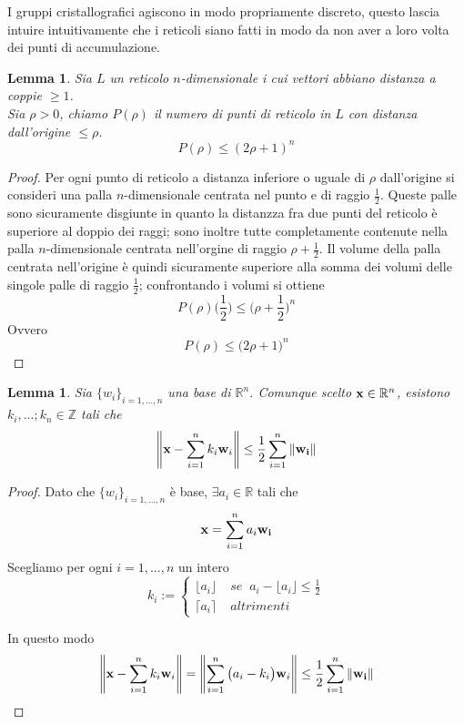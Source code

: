 \documentclass[a4paper,11pt,openright,twoside	]{book}
\newtheorem{lemma}[theorem]{Lemma}
\begin{document}
I gruppi cristallografici agiscono in modo propriamente discreto, questo lascia intuire intuitivamente che i reticoli siano fatti in modo da non aver a loro volta dei punti di accumulazione. 
\begin{lemma}
\label{lemma:rho}
Sia $L$ un reticolo $n$-dimensionale i cui vettori abbiano distanza a coppie $\geq 1$. \\
Sia $\rho >0$, chiamo $P(\rho)$ il numero di punti di reticolo in $L$ con distanza dall'origine $\leq \rho$. 
\[ P(\rho) \leq (2 \rho +1)^n\]
\end{lemma}
\begin{proof}
Per ogni punto di reticolo a distanza inferiore o uguale di $\rho$ dall'origine si consideri una palla $n$-dimensionale centrata nel punto e di raggio $\frac{1}{2}$. Queste palle sono sicuramente disgiunte in quanto la distanzza fra due punti del reticolo è superiore al doppio dei raggi; sono inoltre tutte completamente contenute nella palla $n$-dimensionale centrata nell'orgine di raggio $ \rho + \frac{1}{2}$. 
Il volume della palla centrata nell'origine è quindi sicuramente superiore alla somma dei volumi delle singole palle di raggio $\frac{1}{2}$; confrontando i volumi si ottiene
\[ P(\rho) \bigg(  \frac{1}{2} \bigg) \leq \bigg( \rho + \frac{1}{2} \bigg)^n \]
Ovvero
\[ P(\rho) \leq \bigg( 2 \rho + 1 \bigg)^n \]
\end{proof}

\begin{lemma}
\label{lemma:somma}
Sia $\{w_i \}_{i=1,...,n}$ una base di $\mathbb{R}^n$. Comunque scelto $\vb{x} \in \mathbb{R}^n$, esistono $k_i, ...; k_n \in \mathbb{Z}$ tali che 
\[ \norm{\vb{x} - \sum_{i=1}^{n} k_i \vb{w}_i} \leq \frac{1}{2} \sum_{i=1}^{n} \norm{\vb{w_i}} \] 
\end{lemma}

\begin{proof}
Dato che $\{w_i \}_{i=1,...,n}$ è base, $\exists a_i \in \mathbb{R}$ tali che 
\[\vb{x} = \sum_{i=1}^{n} a_i \vb{w_i} \]
Scegliamo per ogni $i= 1,...,n$ un intero 
\[ k_i := \begin{cases} 
\lfloor a_i \rfloor \;  & se \; \; a_i - \lfloor a_i \rfloor \leq \frac{1}{2} \\
\lceil a_i \rceil \; & altrimenti
\end{cases}\]

In questo modo 
\[ \norm{\vb{x} - \sum_{i=1}^{n} k_i \vb{w}_i} = \norm{\sum_{i=1}^{n} \big(a_i - k_i \big)\vb{w}_i} \leq  \frac{1}{2} \sum_{i=1}^{n} \norm{\vb{w_i}}  \]
\end{proof}
\end{document}
